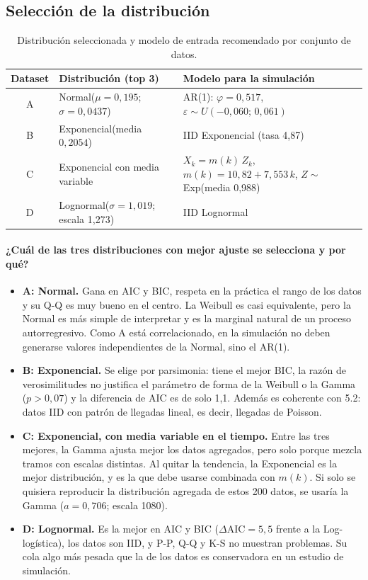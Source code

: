 \documentclass[11pt,a4paper]{article}
\begin{document}
\subsection{Selección de la distribución}
\begin{table}[H]\centering\small
\caption{Distribución seleccionada y modelo de entrada recomendado por conjunto de datos.}\label{tab:seleccion}
\begin{tabular}{c>{\raggedright\arraybackslash}p{}>{\raggedright\arraybackslash}p{}}\toprule
\textbf{Dataset}&\textbf{Distribución (top 3)}&\textbf{Modelo para la simulación}\\\midrule
A&Normal($\mu=0{,}195$; $\sigma=0{,}0437$)&AR(1): $\varphi=0{,}517$, $\varepsilon\sim U(-0{,}060;\,0{,}061)$\\
B&Exponencial(media $0{,}2054$)&IID Exponencial (tasa 4,87)\\
C&Exponencial con media variable&$X_k=m(k)\,Z_k$, $m(k)=10{,}82+7{,}553\,k$, $Z\sim$ Exp(media 0,988)\\
D&Lognormal($\sigma=1{,}019$; escala 1,273)&IID Lognormal\\\bottomrule
\end{tabular}\end{table}

\paragraph{¿Cuál de las tres distribuciones con mejor ajuste se selecciona y por qué?}
\begin{itemize}
 \item \textbf{A: Normal.} Gana en AIC y BIC, respeta en la práctica el rango de los datos y su Q-Q
 es muy bueno en el centro. La Weibull es casi equivalente, pero la Normal es más simple de
 interpretar y es la marginal natural de un proceso autorregresivo. Como A está correlacionado,
 en la simulación no deben generarse valores independientes de la Normal, sino el AR(1).
 \item \textbf{B: Exponencial.} Se elige por parsimonia: tiene el mejor BIC, la razón de
 verosimilitudes no justifica el parámetro de forma de la Weibull o la Gamma ($p>0{,}07$) y la
 diferencia de AIC es de solo 1,1. Además es coherente con 5.2: datos IID con patrón de
 llegadas lineal, es decir, llegadas de Poisson.
 \item \textbf{C: Exponencial, con media variable en el tiempo.} Entre las tres mejores, la Gamma
 ajusta mejor los datos agregados, pero solo porque mezcla tramos con escalas distintas. Al
 quitar la tendencia, la Exponencial es la mejor distribución, y es la que debe usarse
 combinada con $m(k)$. Si solo se quisiera reproducir la distribución agregada de estos 200
 datos, se usaría la Gamma ($a=0{,}706$; escala 1080).
 \item \textbf{D: Lognormal.} Es la mejor en AIC y BIC ($\Delta\text{AIC}=5{,}5$ frente a la
 Log-logística), los datos son IID, y P-P, Q-Q y K-S no muestran problemas. Su cola algo más pesada
 que la de los datos es conservadora en un estudio de simulación.
\end{itemize}
\end{document}
